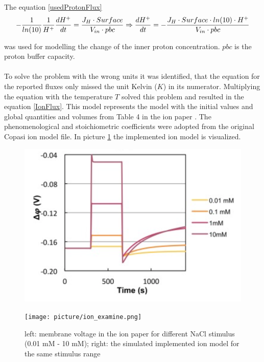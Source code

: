 The equation \ref{usedProtonFlux} 
\begin{equation}\label{usedProtonFlux}
- \frac{1}{ln(10)} \frac{1}{H^+}\frac{dH^+}{dt} = \frac{J_H \cdot Surface}{V_{in} \cdot pbc}\\
\Rightarrow \frac{dH^+}{dt}=-\frac{J_H \cdot Surface \cdot ln(10) \cdot H^+}{V_{in} \cdot pbc}
\end{equation}

was used for modelling the change of the inner proton concentration. $pbc$ is the proton buffer capacity.\\\\
To solve the problem with the wrong units it was identified, that the equation for the reported fluxes only missed the unit Kelvin ($K$) in its numerator. Multiplying the equation with the temperature $T$ solved this problem and resulted in the equation \ref{IonFlux}.
This model represents the model with the initial values and global quantities and volumes from Table 4 in the ion paper \cite{Gerber_2016}. The phenomenological and stoichiometric coefficients were adopted from the original Copasi ion model file. In picture \ref{IonImplemented} the implemented ion model is visualized.
\begin{figure}[htbp]
	
	\begin{minipage}{0,5\textwidth}
		
		\includegraphics[width=\textwidth]{picture/Ion_Paper.png}
		
		\label{IonPaper} 
	\end{minipage}
	\begin{minipage}{0,5\textwidth}
		
		\texttt{[image: picture/ion\_examine.png]}
		
		\label{IonImplemented} 
	\end{minipage}
	\caption{left: membrane voltage in the ion paper for different NaCl stimulus (0.01 mM - 10 mM); right: the simulated implemented ion model for the same stimulus range }
\end{figure}



